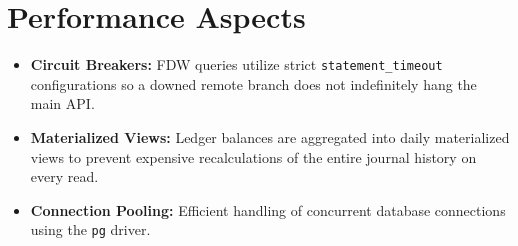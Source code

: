 \section{Performance Aspects}
\begin{itemize}
    \item \textbf{Circuit Breakers:} FDW queries utilize strict \texttt{statement\_timeout} configurations so a downed remote branch does not indefinitely hang the main API.
    \item \textbf{Materialized Views:} Ledger balances are aggregated into daily materialized views to prevent expensive recalculations of the entire journal history on every read.
    \item \textbf{Connection Pooling:} Efficient handling of concurrent database connections using the \texttt{pg} driver.
\end{itemize}
